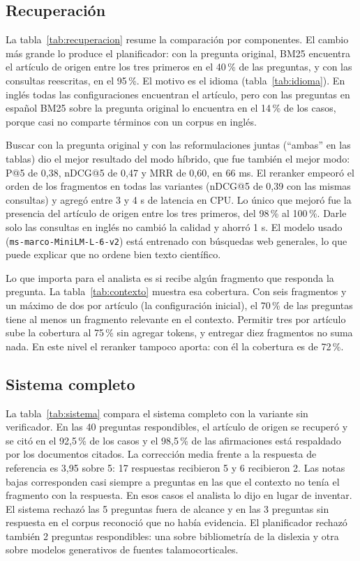 \subsection{Recuperación}

La tabla~\ref{tab:recuperacion} resume la comparación por componentes. El cambio más grande lo
produce el planificador: con la pregunta original, BM25 encuentra el artículo de origen entre los
tres primeros en el 40\,\% de las preguntas, y con las consultas reescritas, en el 95\,\%. El motivo
es el idioma (tabla~\ref{tab:idioma}). En inglés todas las configuraciones encuentran el artículo,
pero con las preguntas en español BM25 sobre la pregunta original lo encuentra en el 14\,\% de los
casos, porque casi no comparte términos con un corpus en inglés.

Buscar con la pregunta original y con las reformulaciones juntas (``ambas'' en las tablas) dio el
mejor resultado del modo híbrido, que fue también el mejor modo: P@5 de 0,38, nDCG@5 de 0,47 y MRR
de 0,60, en 66 ms. El reranker empeoró el orden de los fragmentos en todas las variantes (nDCG@5 de
0,39 con las mismas consultas) y agregó entre 3 y 4 s de latencia en CPU. Lo único que mejoró fue la
presencia del artículo de origen entre los tres primeros, del 98\,\% al 100\,\%. Darle solo las
consultas en inglés no cambió la calidad y ahorró 1 s. El modelo usado (\texttt{ms-marco-MiniLM-L-6-v2})
está entrenado con búsquedas web generales, lo que puede explicar que no ordene bien texto científico.




Lo que importa para el analista es si recibe algún fragmento que responda la pregunta. La
tabla~\ref{tab:contexto} muestra esa cobertura. Con seis fragmentos y un máximo de dos por artículo
(la configuración inicial), el 70\,\% de las preguntas tiene al menos un fragmento relevante en el
contexto. Permitir tres por artículo sube la cobertura al 75\,\% sin agregar tokens, y entregar diez
fragmentos no suma nada. En este nivel el reranker tampoco aporta: con él la cobertura es de 72\,\%.



\subsection{Sistema completo}

La tabla~\ref{tab:sistema} compara el sistema completo con la variante sin verificador. En las 40
preguntas respondibles, el artículo de origen se recuperó y se citó en el 92,5\,\% de los casos y el
98,5\,\% de las afirmaciones está respaldado por los documentos citados. La corrección media frente
a la respuesta de referencia es 3,95 sobre 5: 17 respuestas recibieron 5 y 6 recibieron 2. Las notas
bajas corresponden casi siempre a preguntas en las que el contexto no tenía el fragmento con la
respuesta. En esos casos el analista lo dijo en lugar de inventar. El sistema rechazó las 5 preguntas
fuera de alcance y en las 3 preguntas sin respuesta en el corpus reconoció que no había evidencia.
El planificador rechazó también 2 preguntas respondibles: una sobre bibliometría de la dislexia y
otra sobre modelos generativos de fuentes talamocorticales.

